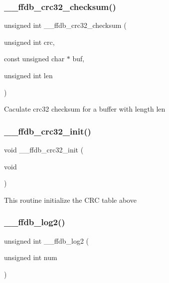 \subsubsection{\texorpdfstring{\_\_ffdb\_crc32\_checksum()}{\_\_ffdb\_crc32\_checksum()}}
{\footnotesize\ttfamily unsigned int \+\_\+\+\_\+ffdb\+\_\+crc32\+\_\+checksum (\begin{DoxyParamCaption}\item[{unsigned int}]{crc,  }\item[{const unsigned char $\ast$}]{buf,  }\item[{unsigned int}]{len }\end{DoxyParamCaption})}

Caculate crc32 checksum for a buffer with length len \mbox{\label{adat-devel_2other__libs_2filedb_2filehash_2ffdb__hash__func_8c_a7dd14a868e00186dc5b316ff25f1f85e}} 
\subsubsection{\texorpdfstring{\_\_ffdb\_crc32\_init()}{\_\_ffdb\_crc32\_init()}}
{\footnotesize\ttfamily void \+\_\+\+\_\+ffdb\+\_\+crc32\+\_\+init (\begin{DoxyParamCaption}\item[{void}]{ }\end{DoxyParamCaption})}

This routine initialize the C\+RC table above \mbox{\label{adat-devel_2other__libs_2filedb_2filehash_2ffdb__hash__func_8c_a79d8cb8240ebb32c74ba51a0eac8aa64}} 
\subsubsection{\texorpdfstring{\_\_ffdb\_log2()}{\_\_ffdb\_log2()}}
{\footnotesize\ttfamily unsigned int \+\_\+\+\_\+ffdb\+\_\+log2 (\begin{DoxyParamCaption}\item[{unsigned int}]{num }\end{DoxyParamCaption})}

